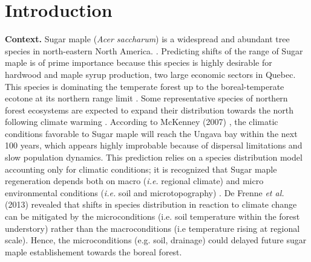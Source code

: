 


\newpage
\setcounter{page}{1}

\section{Introduction}

\textbf{Context.} Sugar maple (\textit{Acer saccharum}) is a widespread and
abundant tree species in north-eastern North America.
\cite{Graignic2013,Messaoud2007,Kellman2004,Barras1998}. Predicting shifts of
the range of Sugar maple is of prime importance because this species is highly
desirable for hardwood and maple syrup production, two large economic sectors
in Quebec. This species is dominating the temperate forest up to the boreal-temperate 
ecotone at its northern range limit \cite{Barras1998}. Some
representative species of northern forest ecosystems are expected to expand
their distribution towards the north following climate warming
\cite{Sciences2014,Iverson2002}. According to McKenney (2007)
\cite{Sciences2014}, the climatic conditions  favorable to Sugar maple  will
reach the Ungava bay within the next 100 years, which appears highly
improbable because of dispersal limitations and slow population dynamics. This
prediction relies on a species distribution model accounting only for climatic
conditions; it is recognized that Sugar maple regeneration depends both on
macro  (\textit{i.e.} regional climate) and micro environmental conditions
(\textit{i.e.} soil and microtopography) \cite{Graignic2013,Lafleur2010}. De
Frenne \textit{et al.} (2013) revealed that shifts in species distribution in
reaction to climate change can be mitigated by the microconditions (i.e. soil
temperature within the forest understory) rather than the macroconditions (i.e
temperature rising at regional scale). Hence, the microconditions (e.g. soil,
drainage) could delayed future sugar maple establishement towards the boreal
forest.\\

